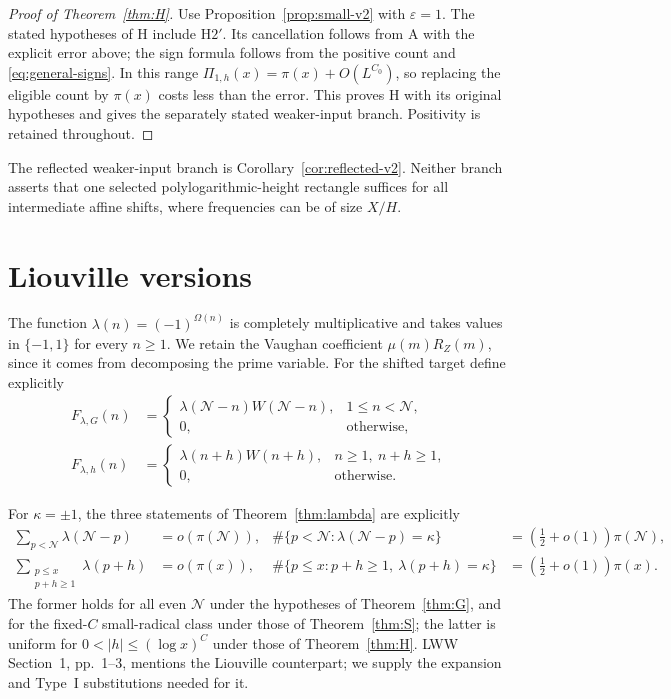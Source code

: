 \documentclass[11pt]{article}
\theoremstyle{definition}
\newcommand{\GN}{\mathcal N}
\theoremstyle{remark}
\numberwithin{equation}{section}
\begin{document}
\begin{proof}[Proof of Theorem~\ref{thm:H}]
Use Proposition~\ref{prop:small-v2} with $\varepsilon=1$.
The stated hypotheses of H include $\mathrm H2'$.
Its cancellation follows from A with the explicit error above;
the sign formula follows from the positive count and
\eqref{eq:general-signs}. In this range
$\Pi_{1,h}(x)=\pi(x)+O(L^{C_0})$, so replacing the eligible
count by $\pi(x)$ costs less than the error. This proves H
with its original hypotheses and gives the separately stated
weaker-input branch. Positivity is retained throughout.
\end{proof}
The reflected weaker-input branch is
Corollary~\ref{cor:reflected-v2}. Neither branch asserts that
one selected polylogarithmic-height rectangle suffices for all
intermediate affine shifts, where frequencies can be of size $X/H$.

\section{Liouville versions}\label{sec:liouville}
The function $\lambda(n)=(-1)^{\Omega(n)}$ is completely
multiplicative and takes values in $\{-1,1\}$ for every $n\ge1$.
We retain the Vaughan coefficient $\mu(m)R_Z(m)$, since it comes
from decomposing the prime variable.
For the shifted target define explicitly
\begin{equation}\label{eq:F-lambda}
 \begin{split}
 F_{\lambda,G}(n)&=\begin{cases}
 \lambda(\GN-n)W(\GN-n),&1\le n<\GN,\\0,&\text{otherwise},\end{cases}\\
 F_{\lambda,h}(n)&=\begin{cases}
 \lambda(n+h)W(n+h),&n\ge1,\ n+h\ge1,\\0,&\text{otherwise}.
 \end{cases}
 \end{split}
\end{equation}

For $\kappa=\pm1$, the three statements of
Theorem~\ref{thm:lambda} are explicitly
\begin{align}
 \sum_{p<\GN}\lambda(\GN-p)&=o(\pi(\GN)),&
 \#\{p<\GN:\lambda(\GN-p)=\kappa\}
       &=\left(\tfrac12+o(1)\right)\pi(\GN),\label{eq:Glambda}\\
 \sum_{\substack{p\le x\\p+h\ge1}}\lambda(p+h)&=o(\pi(x)),&
 \#\{p\le x:p+h\ge1,\ \lambda(p+h)=\kappa\}
       &=\left(\tfrac12+o(1)\right)\pi(x).\label{eq:Hlambda}
\end{align}
The former holds for all even $\GN$ under the hypotheses of
Theorem~\ref{thm:G}, and for the fixed-$C$ small-radical class
under those of Theorem~\ref{thm:S}; the latter is uniform for
$0<|h|\le(\log x)^C$ under those of Theorem~\ref{thm:H}.
LWW Section~1, pp.~1--3, mentions the Liouville counterpart; we
supply the expansion and Type~I substitutions needed for it.
\end{document}
